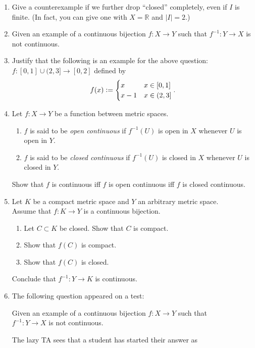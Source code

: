\documentclass[12pt]{article}
\theoremstyle{definition}
\numberwithin{thm}{section}
\newenvironment{blockquote}
{\begin{mdframed}[skipabove=0pt, skipbelow=0pt, innertopmargin=4pt, innerbottommargin=4pt, bottomline=false,topline=false,rightline=false, linewidth=2pt]}
{\end{mdframed}}
\begin{document}
\begin{enumerate}
	\item Give a counterexample if we further drop ``closed'' completely, even if $I$ is finite. (In fact, you can give one with $X = \mathbb{R}$ and $|I| = 2.$)
	\item Given an example of a continuous bijection $f:X \to Y$ such that $f^{-1}:Y \to X$ is not continuous.
	\item \label{q:nothomeo} Justify that the following is an example for the above question:\\
	$f:[0, 1] \cup (2, 3] \to [0, 2]$ defined by
	\begin{equation*} 
		f(x) \vcentcolon= \begin{cases}
			x & x \in [0, 1]\\
			x - 1 & x \in (2, 3]
		\end{cases}.
	\end{equation*}
	\item Let $f:X\to Y$ be a function between metric spaces.
	\begin{enumerate}
		\item $f$ is said to be \emph{open continuous} if $f^{-1}(U)$ is open in $X$ whenever $U$ is open in $Y.$
		\item $f$ is said to be \emph{closed continuous} if $f^{-1}(U)$ is closed in $X$ whenever $U$ is closed in $Y.$
	\end{enumerate}
	Show that $f$ is continuous iff $f$ is open continuous iff $f$ is closed continuous.
	\item Let $K$ be a compact metric space and $Y$ an arbitrary metric space.\\
	Assume that $f:K\to Y$ is a continuous bijection.
	\begin{enumerate}
		\item Let $C \subset K$ be closed. Show that $C$ is compact.
		\item Show that $f(C)$ is compact.
		\item Show that $f(C)$ is closed.
	\end{enumerate}
	Conclude that $f^{-1}:Y \to K$ is continuous.
	\item The following question appeared on a test:\\
	\begin{blockquote}
		Given an example of a continuous bijection $f:X \to Y$ such that \\
		$f^{-1}:Y \to X$ is not continuous. 
	\end{blockquote}
	The lazy TA sees that a student has started their answer as\\

\end{enumerate}
\end{document}
